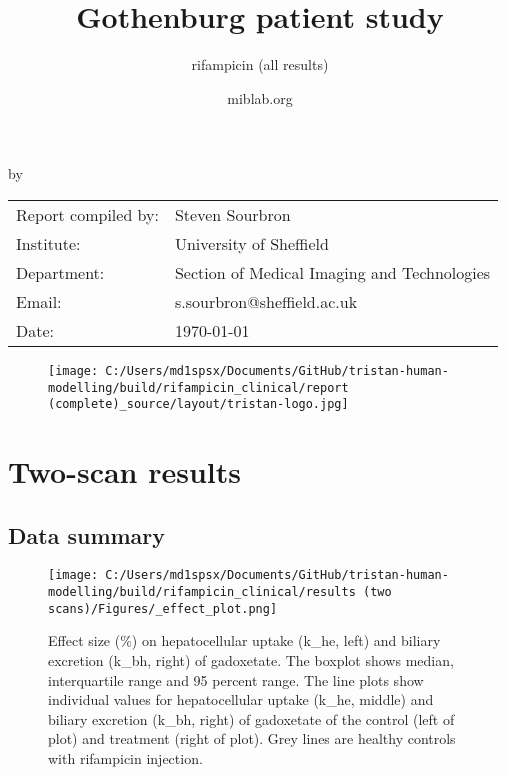 \documentclass{epflreport}%
\begin{document}
%
\normalsize%
\frontmatter%
\title{Gothenburg patient study}%
\subtitle{rifampicin (all results)}%
\author{miblab.org}%
\subject{D2.07 {-} Internal report}%
%
%
%
\makecover%
\begin{titlepage}%
\begin{center}%
\makeatletter%
\largetitlestyle\fontsize{45}{45}\selectfont\@title%
\makeatother%
\linebreak%
\makeatletter%
\ifdefvoid{\@subtitle}{}{\bigskip\titlestyle\fontsize{20}{20}\selectfont\@subtitle}%
\makeatother%
\linebreak%
\bigskip%
\bigskip%
by%
\linebreak%
\bigskip%
\bigskip%
\makeatletter%
\largetitlestyle\fontsize{25}{25}\selectfont\@author%
\makeatother%
\vfill%
\large%
\begin{tabular}{ll}%
\hline%
Report compiled by: &Steven Sourbron\\%
Institute: &University of Sheffield\\%
Department: &Section of Medical Imaging and Technologies\\%
Email: &s.sourbron@sheffield.ac.uk\\%
Date: &\today\\%
\hline%
\end{tabular}%


\begin{figure}[b!]%
\centering%
\centering%
\texttt{[image: C:/Users/md1spsx/Documents/GitHub/tristan-human-modelling/build/rifampicin\_clinical/report (complete)\_source/layout/tristan-logo.jpg]}%
\end{figure}

%
\end{center}%
\end{titlepage}%
\newpage%
\tableofcontents%
\mainmatter%
\clearpage%
\chapter{Two{-}scan results}%
\section{Data summary}%
\label{sec:Datasummary}%

%


\begin{figure}[h!]%
\centering%
\texttt{[image: C:/Users/md1spsx/Documents/GitHub/tristan-human-modelling/build/rifampicin\_clinical/results (two scans)/Figures/\_effect\_plot.png]}%
\caption{Effect size (\%) on hepatocellular uptake (k\_he, left) and biliary excretion (k\_bh, right) of gadoxetate. The boxplot shows median, interquartile range and 95 percent range. The line plots show individual values for hepatocellular uptake (k\_he, middle) and biliary excretion (k\_bh, right) of gadoxetate of the control (left of plot) and treatment (right of plot). Grey lines are healthy controls with rifampicin injection.}%
\end{figure}
\end{document}
